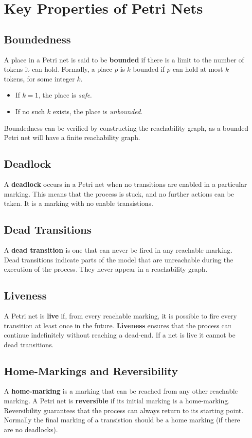     
    \section{Key Properties of Petri Nets}
    
    \subsection{Boundedness}
    A place in a Petri net is said to be \textbf{bounded} if there is a limit to the number of tokens it can hold. Formally, a place $p$ is $k$-bounded if $p$ can hold at most $k$ tokens, for some integer $k$.
    \begin{itemize}
        \item If $k = 1$, the place is \textit{safe}.
        \item If no such $k$ exists, the place is \textit{unbounded}.
    \end{itemize}
    Boundedness can be verified by constructing the reachability graph, as a bounded Petri net will have a finite reachability graph.
    
    \subsection{Deadlock}
    A \textbf{deadlock} occurs in a Petri net when no transitions are enabled in a particular marking. This means that the process is stuck, and no further actions can be taken. It is a marking with no enable transistions.
    
    \subsection{Dead Transitions}
    A \textbf{dead transition} is one that can never be fired in any reachable marking. Dead transitions indicate parts of the model that are unreachable during the execution of the process. They never appear in a reachability graph.
    
    \subsection{Liveness}
    A Petri net is \textbf{live} if, from every reachable marking, it is possible to fire every transition at least once in the future. \textbf{Liveness} ensures that the process can continue indefinitely without reaching a dead-end. If a net is live it cannot be dead transitions. 
    
    \subsection{Home-Markings and Reversibility}
    A \textbf{home-marking} is a marking that can be reached from any other reachable marking. A Petri net is \textbf{reversible} if its initial marking is a home-marking. Reversibility guarantees that the process can always return to its starting point. Normally the final marking of a transistion should be a home marking (if there are no deadlocks).
    
